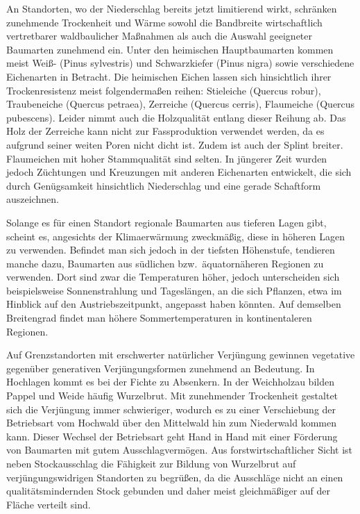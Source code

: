 \documentclass[twocolumn]{scrartcl}
\begin{document}
An Standorten, wo der Niederschlag bereits jetzt limitierend wirkt,
schränken zunehmende
Trockenheit und Wärme sowohl die Bandbreite wirtschaftlich
vertretbarer waldbaulicher Maßnahmen als auch die Auswahl geeigneter
Baumarten zunehmend ein. Unter den heimischen Hauptbaumarten kommen
meist Weiß- (Pinus sylvestris) und Schwarzkiefer (Pinus
nigra) sowie verschiedene Eichenarten in Betracht.
Die heimischen Eichen lassen sich hinsichtlich ihrer Trockenresistenz
meist folgendermaßen reihen:
Stieleiche (Quercus robur), Traubeneiche (Quercus petraea),
Zerreiche (Quercus cerris), Flaumeiche (Quercus pubescens). Leider
nimmt auch die Holzqualität entlang dieser Reihung ab. Das Holz der
Zerreiche kann nicht zur Fassproduktion verwendet werden, da es
aufgrund seiner weiten Poren nicht dicht ist. Zudem ist auch der
Splint breiter.
Flaumeichen mit hoher Stammqualität sind selten. In jüngerer Zeit
wurden jedoch Züchtungen und Kreuzungen mit anderen Eichenarten
entwickelt, die sich durch Genügsamkeit hinsichtlich Niederschlag und eine
gerade Schaftform auszeichnen.

Solange es für einen Standort regionale Baumarten aus tieferen Lagen gibt,
scheint es, angesichts der Klimaerwärmung zweckmäßig, diese in höheren Lagen zu
verwenden. Befindet man sich jedoch in der tiefsten Höhenstufe, tendieren manche
dazu, Baumarten aus südlichen bzw.\ äquatornäheren Regionen zu verwenden.
Dort sind zwar die Temperaturen höher, jedoch unterscheiden sich beispielsweise Sonnenstrahlung und Tageslängen, an die sich Pflanzen, etwa im Hinblick auf den Austriebszeitpunkt, angepasst haben könnten.
Auf demselben Breitengrad findet man höhere
Sommertemperaturen in kontinentaleren Regionen.

Auf Grenzstandorten mit erschwerter natürlicher Verjüngung gewinnen vegetative
gegenüber generativen Verjüngungsformen zunehmend an Bedeutung.
In Hochlagen kommt es bei der Fichte zu Absenkern.
In der Weichholzau bilden Pappel und Weide häufig Wurzelbrut.
Mit zunehmender Trockenheit gestaltet sich die Verjüngung immer
schwieriger, wodurch es zu einer Verschiebung der Betriebsart vom
Hochwald über den Mittelwald hin zum Niederwald kommen kann.
Dieser Wechsel der Betriebsart geht Hand in Hand mit einer Förderung
von Baumarten mit gutem Ausschlagvermögen.
Aus forstwirtschaftlicher Sicht ist
neben Stockausschlag die Fähigkeit zur Bildung von Wurzelbrut auf
verjüngungswidrigen Standorten zu begrüßen, da die Ausschläge nicht an einen
qualitätsmindernden Stock gebunden und daher meist gleichmäßiger auf der Fläche
verteilt sind.
\end{document}
